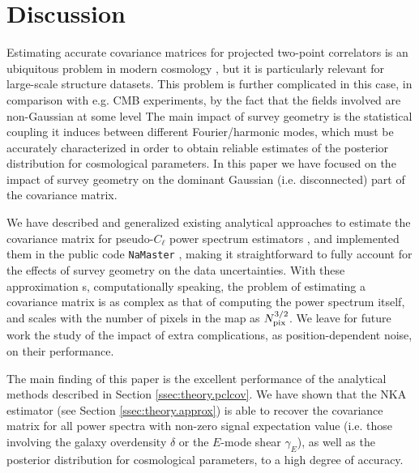 \documentclass[a4paper,11pt]{article}
\newcommand{\cgg}[1]{{\color{olive} #1}}
\begin{document}
  \section{Discussion}\label{sec:discussion}
    Estimating accurate covariance matrices for projected two-point
    correlators is an ubiquitous problem in modern cosmology
    \cite{2013PhRvD..88f3537D,2013MNRAS.432.1928T,2017arXiv170609359K}, but it
    is particularly relevant for large-scale structure datasets. This problem
    is further complicated in this case, in comparison with e.g. CMB
    experiments, by 
    the fact that the fields involved are
    non-Gaussian at some level
    The main impact of survey geometry is the statistical
    coupling it induces between different Fourier/harmonic modes, which must
    be accurately characterized in order to obtain reliable estimates of the
    posterior distribution for cosmological parameters. In this paper we have
    focused on the impact of survey geometry on the dominant Gaussian (i.e.
    disconnected) part of the covariance matrix.
    
    We have described and generalized existing analytical approaches to
    estimate the covariance matrix for pseudo-$C_\ell$ power spectrum
    estimators
    \cite{2004MNRAS.349..603E,2005MNRAS.360.1262B,2017A&A...602A..41C}, and
    implemented them in the public code {\tt NaMaster}
    \cite{2019MNRAS.484.4127A}, making it straightforward to fully account for
    the effects of survey geometry on the data uncertainties. With these
    approximation\cgg{s}, computationally speaking, the problem of estimating a
    covariance matrix is as complex as that of computing the power spectrum
    itself, and scales with the number of pixels in the map as $N_{\rm
      pix}^{3/2}$. \cgg{We leave for future work the study of the impact of
      extra complications, as position-dependent noise, on their performance.}
    
    The main finding of this paper is the excellent performance of the
    analytical methods described in Section \ref{ssec:theory.pclcov}. We have
    shown that
    the NKA estimator (see Section \ref{ssec:theory.approx}) is able to
    recover the covariance matrix for all power spectra with non-zero signal
    expectation value (i.e. those involving the galaxy overdensity $\delta$ or
    the $E$-mode shear $\gamma_E$), as well as the posterior distribution for
    cosmological parameters, to a high degree of accuracy.
\end{document}
